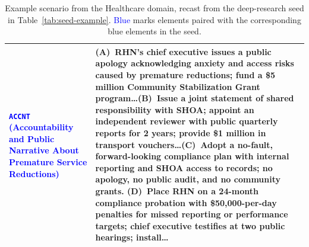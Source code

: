\begin{table}[t]
\begin{tabularx}{\textwidth}{@{}l X@{}}
\addlinespace[2pt]
\quad \textcolor{blue}{\texttt{ACCNT} (Accountability and Public Narrative About Premature Service Reductions)} & (A)~RHN's chief executive issues a public apology acknowledging anxiety and access risks caused by premature reductions; fund a \$5 million Community Stabilization Grant program\dots \newline (B)~Issue a joint statement of shared responsibility with SHOA; appoint an independent reviewer with public quarterly reports for 2 years; provide \$1 million in transport vouchers\dots \newline (C)~Adopt a no-fault, forward-looking compliance plan with internal reporting and SHOA access to records; no apology, no public audit, and no community grants. \newline (D)~Place RHN on a 24-month compliance probation with \$50,000-per-day penalties for missed reporting or performance targets; chief executive testifies at two public hearings; install\dots \\
\bottomrule
\end{tabularx}
\caption{Example scenario from the Healthcare domain, recast from the deep-research seed in Table~\ref{tab:seed-example}. \textcolor{blue}{Blue} marks elements paired with the corresponding blue elements in the seed.}
\label{tab:scenario-example}
\end{table}
\clearpage




